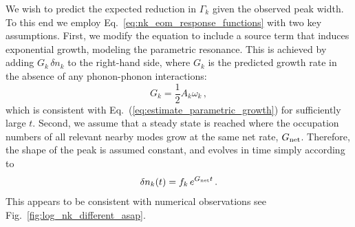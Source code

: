 \documentclass[aps,prd,notitlepage,amsfonts,amssymb,amsmath,nofootinbib,superscriptaddress,longbibliography]{revtex4-2}
\begin{document}
\begin{appendices}
We wish to predict the expected reduction in $\Gamma_{k}$ given the observed peak width.  To this end we employ Eq.~\eqref{eq:nk_eom_response_functions} with two key assumptions.  First, we modify the equation to include a source term that induces exponential growth, modeling the parametric resonance.  This is achieved by adding $G_{k} \, \delta n_{k}$ to the right-hand side, where $G_{k}$ is the predicted growth rate in the absence of any phonon-phonon interactions:
\begin{equation}
G_{k} = \frac{1}{2} A_{k} \omega_{k} \,,
\end{equation}
which is consistent with Eq.~(\ref{eq:estimate_parametric_growth}) for sufficiently large $t$.  Second, we assume that a steady state is reached where the occupation numbers of all relevant nearby modes grow at the same net rate, $G_{\rm net}$.  Therefore, the shape of the peak is assumed constant, and evolves in time simply according to
\begin{equation}
    \delta n_{k}(t) = f_{k} \, e^{G_{\rm net} t} \,.
\end{equation}
This appears to be consistent with numerical observations see Fig.~\ref{fig:log_nk_different_asap}. 


\end{appendices}
\end{document}
